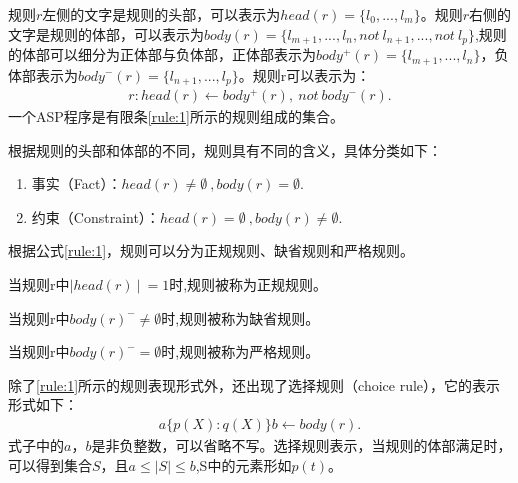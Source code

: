 规则$r$左侧的文字是规则的头部，可以表示为$head(r)=\{l_0,...,l_m\}$。规则$r$右侧的文字是规则的体部，可以表示为$body(r)=\{l_{m+1}, ..., l_n,not \ l_{n+1},...,not \ l_p \}$,规则的体部可以细分为正体部与负体部，正体部表示为$body^+(r)=\{l_{m+1}, ..., l_n\}$，负体部表示为$body^-(r)=\{l_{n+1}, ..., l_p \}$。规则r可以表示为：
\begin{align}
    \label{rule:2}
    r: head(r)\leftarrow body^+(r) , \ not \ body^-(r).
\end{align}
一个ASP程序是有限条\eqref{rule:1}所示的规则组成的集合。

根据规则的头部和体部的不同，规则具有不同的含义，具体分类如下：
\begin{enumerate}[label=(\arabic*),topsep=0pt]
    \setlength\itemsep{-0.3em}
    \item 事实（Fact）：$ head(r) \neq \emptyset \ ,body(r) = \emptyset .$
    \item 约束（Constraint）：$ head(r) = \emptyset \ ,body(r) \neq \emptyset .$
\end{enumerate}

根据公式\eqref{rule:1}，规则可以分为正规规则、缺省规则和严格规则。
\begin{definition}[正规规则]当规则r中$|head(r) \ |\ =1$时,规则被称为正规规则。
\end{definition}
\begin{definition}[缺省规则]当规则r中$body(r)^- \neq \emptyset$时,规则被称为缺省规则。
\end{definition}
\begin{definition}[严格规则]当规则r中$body(r)^- = \emptyset$时,规则被称为严格规则。
\end{definition}
除了\eqref{rule:1}所示的规则表现形式外，还出现了选择规则（choice rule），它的表示形式如下：
\begin{align}
    \label{rule:3}
    a \{p(X):q(X)\} b \leftarrow body(r) .
\end{align}
式子中的$a$，$b$是非负整数，可以省略不写。选择规则表示，当规则的体部满足时，可以得到集合$S$，且$a \leq |S| \leq b$,S中的元素形如$p(t)$。


